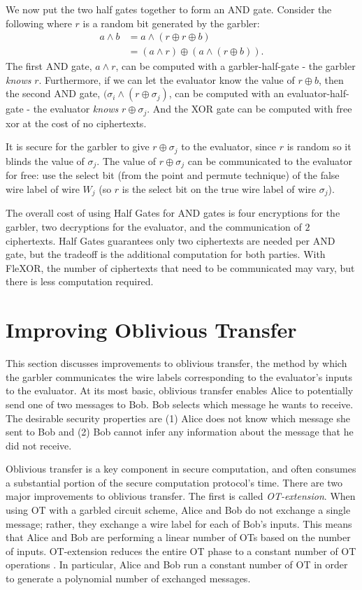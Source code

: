 We now put the two half gates together to form an AND gate. 
Consider the following where $r$ is a random bit generated by the garbler:
\begin{align}
    a \wedge b & = a \wedge (r \oplus r \oplus b) \\
               & = (a \wedge r) \oplus (a \wedge (r \oplus b)).
\end{align}
The first AND gate, $a \wedge r$, can be computed with a garbler-half-gate - the garbler \textit{knows} $r$. 
Furthermore, if we can let the evaluator know the value of $r \oplus b$, then the second AND gate, $(\sigma_i \wedge (r \oplus \sigma_j)$, can be computed with an evaluator-half-gate - the evaluator \textit{knows} $r \oplus \sigma_j$. 
And the XOR gate can be computed with free xor at the cost of no ciphertexts. 

It is secure for the garbler to give $r \oplus \sigma_j$ to the evaluator, since $r$ is random so it blinds the value of $\sigma_j$. 
The value of $r \oplus \sigma_j$ can be communicated to the evaluator for free: use the select bit (from the point and permute technique) of the false wire label of wire $W_j$ (so $r$ is the select bit on the true wire label of wire $\sigma_j$).

The overall cost of using Half Gates for AND gates is four encryptions for the garbler, two decryptions for the evaluator, and the communication of $2$ ciphertexts. 
Half Gates guarantees only two ciphertexts are needed per AND gate, but the tradeoff is the additional computation for both parties.
With FleXOR, the number of ciphertexts that need to be communicated may vary, but there is less computation required.

\section{Improving Oblivious Transfer}
This section discusses improvements to oblivious transfer, the method by which the garbler communicates the wire labels corresponding to the evaluator's inputs to the evaluator.
At its most basic, oblivious transfer enables Alice to potentially send one of two messages to Bob.
Bob selects which message he wants to receive.
The desirable security properties are (1) Alice does not know which message she sent to Bob and (2) Bob cannot infer any information about the message that he did not receive.

Oblivious transfer is a key component in secure computation, and often consumes a substantial portion of the secure computation protocol's time.
There are two major improvements to oblivious transfer.
The first is called \textit{OT-extension}.
When using OT with a garbled circuit scheme, Alice and Bob do not exchange a single message; rather, they exchange a wire label for each of Bob's inputs.
This means that Alice and Bob are performing a linear number of OTs based on the number of inputs.
OT-extension reduces the entire OT phase to a constant number of OT operations \cite{otextension}.
In particular, Alice and Bob run a constant number of OT in order to generate a polynomial number of exchanged messages.

